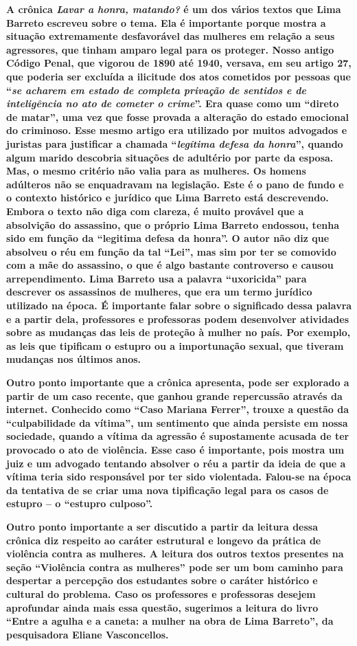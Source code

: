 \textbf{A crônica \emph{Lavar a honra, matando?} é um dos vários textos
que Lima Barreto escreveu sobre o tema. Ela é importante porque mostra a
situação extremamente desfavorável das mulheres em relação a seus
agressores, que tinham amparo legal para os proteger. Nosso antigo
Código Penal, que vigorou de 1890 até 1940, versava, em seu artigo 27,
que poderia ser excluída a ilicitude dos atos cometidos por pessoas que
``\emph{se acharem em estado de completa privação de sentidos e de
inteligência no ato de cometer o crime}''. Era quase como um ``direto de
matar'', uma vez que fosse provada a alteração do estado emocional do
criminoso. Esse mesmo artigo era utilizado por muitos advogados e
juristas para justificar a chamada ``\emph{legítima defesa da honra}'',
quando algum marido descobria situações de adultério por parte da
esposa. Mas, o mesmo critério não valia para as mulheres. Os homens
adúlteros não se enquadravam na legislação. Este é o pano de fundo e o
contexto histórico e jurídico que Lima Barreto está descrevendo. Embora
o texto não diga com clareza, é muito provável que a absolvição do
assassino, que o próprio Lima Barreto endossou, tenha sido em função da
``legitima defesa da honra''. O autor não diz que absolveu o réu em
função da tal ``Lei'', mas sim por ter se comovido com a mãe do
assassino, o que é algo bastante controverso e causou arrependimento.
Lima Barreto usa a palavra ``uxoricida'' para descrever os assassinos de
mulheres, que era um termo jurídico utilizado na época. É importante
falar sobre o significado dessa palavra e a partir dela, professores e
professoras podem desenvolver atividades sobre as mudanças das leis de
proteção à mulher no país. Por exemplo, as leis que tipificam o estupro
ou a importunação sexual, que tiveram mudanças nos últimos anos.}

\textbf{Outro ponto importante que a crônica apresenta, pode ser
explorado a partir de um caso recente, que ganhou grande repercussão
através da internet. Conhecido como ``Caso Mariana Ferrer'', trouxe a
questão da ``culpabilidade da vítima'', um sentimento que ainda persiste
em nossa sociedade, quando a vítima da agressão é supostamente acusada
de ter provocado o ato de violência. Esse caso é importante, pois mostra
um juiz e um advogado tentando absolver o réu a partir da ideia de que a
vítima teria sido responsável por ter sido violentada. Falou-se na época
da tentativa de se criar uma nova tipificação legal para os casos de
estupro -- o ``estupro culposo''. }

\textbf{Outro ponto importante a ser discutido a partir da leitura dessa
crônica diz respeito ao caráter estrutural e longevo da prática de
violência contra as mulheres. A leitura dos outros textos presentes na
seção ``Violência contra as mulheres'' pode ser um bom caminho para
despertar a percepção dos estudantes sobre o caráter histórico e
cultural do problema. Caso os professores e professoras desejem
aprofundar ainda mais essa questão, sugerimos a leitura do livro ``Entre
a agulha e a caneta: a mulher na obra de Lima Barreto'', da pesquisadora
Eliane Vasconcellos. }

